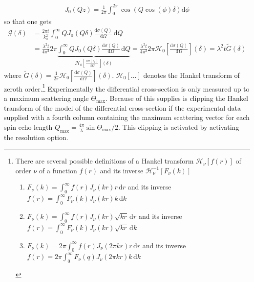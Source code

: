 \begin{align}
J_0(Qz)=\frac{1}{2\pi}\int_{0}^{2\pi} \cos\left(Q\cos(\phi)\delta\right) \mathrm{d}\phi
\end{align}
so that one gets
\begin{align}
\mathcal{G}(\delta) &= \frac{2\pi t}{k_0^2} \int_{0}^{\infty} Q J_0(Q\delta) \frac{\mathrm{d}\sigma(Q)}{\mathrm{d}\Omega} \, \mathrm{d}Q \\
&= \frac{\lambda^2 t}{4\pi^2} 2\pi\underbrace{\int_{0}^{\infty} Q J_0(Q\delta) \frac{\mathrm{d}\sigma(Q)}{\mathrm{d}\Omega} \, \mathrm{d}Q}_{\mathcal{H}_0\left[\frac{\mathrm{d}\sigma(Q)}{\mathrm{d}\Omega}\right](\delta)} = \frac{\lambda^2 t}{4\pi^2}  2\pi \mathcal{H}_0\left[\frac{\mathrm{d}\sigma(Q)}{\mathrm{d}\Omega}\right](\delta)
= \lambda^2 t \tilde{G}(\delta)
\end{align}
where $\tilde{G}(\delta)=\frac{1}{2\pi}\mathcal{H}_0\left[\frac{\mathrm{d}\sigma(Q)}{\mathrm{d}\Omega}\right](\delta)$. $\mathcal{H}_0\left[\ldots\right]$ denotes the Hankel transform of zeroth order.\footnote{\label{footnote:Hankel}
There are several possible definitions of a Hankel transform $\mathcal{H}_\nu\left[f(r)\right]$ of order $\nu$ of a function $f(r)$ and its inverse $\mathcal{H}_\nu^{-1}\left[F_\nu(k)\right]$
\begin{enumerate}
\item $F_\nu(k) = \int_0^\infty f(r) J_\nu(kr) r \,\mathrm{d}r$ and its inverse $f(r)=\int_0^\infty F_\nu(k)J_\nu(kr) k \,\mathrm{d}k$
\item $F_\nu(k) = \int_0^\infty f(r) J_\nu(kr) \sqrt{kr} \,\mathrm{d}r$ and its inverse $f(r)=\int_0^\infty F_\nu(k)J_\nu(kr)  \sqrt{kr}  \, \mathrm{d}k$
\item $F_\nu(k) = 2\pi \int_0^\infty f(r) J_\nu(2\pi kr) r \,\mathrm{d}r$ and its inverse $f(r)=2\pi \int_0^\infty F_\nu(q)J_\nu(2\pi kr) k \,\mathrm{d}k$
\end{enumerate}
}
Experimentally the differential cross-section is only measured up to a maximum scattering angle $\Theta_\mathrm{max}$. Because of this \SASfit supplies is clipping the Hankel transform of the model of the differential cross-section if the experimental data supplied with a fourth column containing the maximum scattering vector for each spin echo length $Q_\mathrm{max}=\frac{4\pi}{\lambda}\sin \Theta_\mathrm{max}/2$. This clipping is activated by activating the resolution option.

